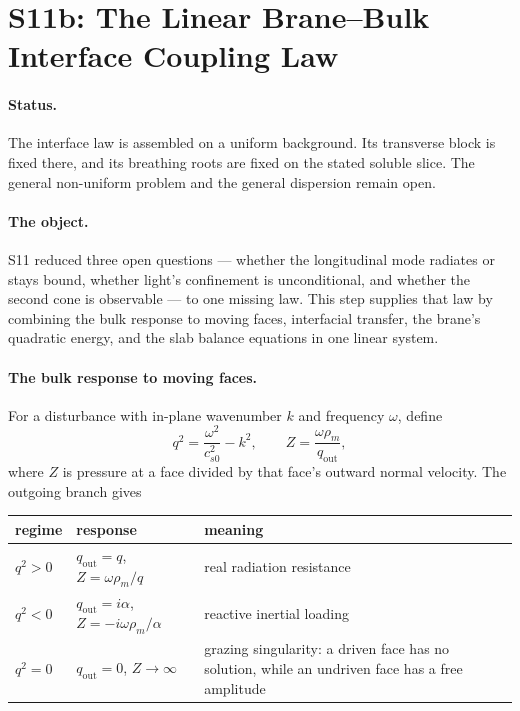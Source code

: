 \section{S11b: The Linear Brane--Bulk Interface Coupling Law}
\label{step:S11b}


\paragraph{Status.}
The interface law is assembled on a uniform background. Its transverse block
is fixed there, and its breathing roots are fixed on the stated soluble slice.
The general non-uniform problem and the general dispersion remain open.

\paragraph{The object.}
S11 reduced three open questions --- whether the longitudinal mode radiates or
stays bound, whether light's confinement is unconditional, and whether the
second cone is observable --- to one missing law. This step supplies that law
by combining the bulk response to moving faces, interfacial transfer, the
brane's quadratic energy, and the slab balance equations in one linear system.

\paragraph{The bulk response to moving faces.}
For a disturbance with in-plane wavenumber \(k\) and frequency \(\omega\),
define
\[
  q^2=\frac{\omega^2}{c_{s0}^2}-k^2,
  \qquad
  Z=\frac{\omega\rho_m}{q_{\mathrm{out}}},
\]
where \(Z\) is pressure at a face divided by that face's outward normal
velocity. The outgoing branch gives
\begin{center}
\begin{tabular}{@{}L{0.20\textwidth}L{0.18\textwidth}L{0.50\textwidth}@{}}
\toprule
regime & response & meaning \\
\midrule
\(q^2>0\) & \(q_{\mathrm{out}}=q\),
  \(Z=\omega\rho_m/q\) & real radiation resistance \\
\(q^2<0\) & \(q_{\mathrm{out}}=i\alpha\),
  \(Z=-i\omega\rho_m/\alpha\) & reactive inertial loading \\
\(q^2=0\) & \(q_{\mathrm{out}}=0\), \(Z\to\infty\) & grazing
  singularity: a driven face has no solution, while an undriven face has a
  free amplitude \\
\bottomrule
\end{tabular}
\end{center}


